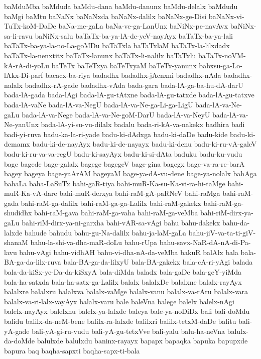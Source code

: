 {baMduMba
baMduda
baMdu-dana
baMdu-danunx
baMdu-delalx
baMdudu
baMgi
baMtu
baNaNx
baNaNxda
baNaNx-dalilx
baNaNx-ge-Disi
baNaNx-vi-TuTx-koM-DaDe
baNa-me-gaLa
baNa-ve-ga-LanUnx
baNiNx-pe-navAvx
baNiNx-sa-li-ravu
baNiNx-salu
baTaTx-ba-ya-lA-de-yeV-nayAyx
baTaTx-ba-ya-lali
baTaTx-ba-ya-la-no-La-goMDu
baTaTxla
baTaTxlaM
baTaTx-la-lilxdadx
baTaTx-la-nenxtitx
baTaTx-lanunx
baTaTx-li-nalilx
baTaTxlu
baTaTx-noVM-kA-rA-di-yoLu
baTeTx
baTeTxya
baTeTxyaM
baTeTx-yanunx
babxsu-ga-Lo-lAkx-Di-parf
bacacx-ba-riya
badadhx
badadhx-jAcnxni
badadhx-nAda
badadhx-nalalx
badadhx-rA-gade
badadhx-vAda
bada-gara
bada-lA-ga-ba-hu-dA-darU
bada-lA-gada
bada-lAgi
bada-lA-gu-tAtxne
bada-lA-gu-tatxde
bada-lA-gu-tatxve
bada-lA-vaNe
bada-lA-va-NegU
bada-lA-va-Ne-ga-Li-ga-LigU
bada-lA-va-Ne-gaLu
bada-lA-va-Nege
bada-lA-va-Ne-goM-DarU
bada-lA-va-NeyU
bada-lA-va-Ne-yanUnx
bada-lA-yi-su-vu-dilalx
badalu
bada-ri-kA-va-nakekx
badhira
badi
badi-yi-ruva
badu-ka-la-ri-yade
badu-ki-dAdxga
badu-ki-daDe
badu-kide
badu-ki-demamx
badu-ki-de-nayAyx
badu-ki-de-nayayx
badu-ki-denu
badu-ki-ru-vA-galeV
badu-ki-ru-va-va-regU
badu-ki-sayAyx
badu-ki-si-dAta
baduku
badu-ku-vudu
bage
bagede
bage-galalx
bagege
bagegeV
bage-gina
bagegx
bage-va-ra-re-barA
bagey
bageya
bage-yaArAM
bageyaM
bage-ya-dA-vu-dene
bage-ya-nolalx
bahAga
bahaLa
baha-LaSuTx
bahi-gaR-tiya
bahi-muR-Ka-su-Ka-vi-ra-hi-taMge
bahi-muR-Ka-vA-dare
bahi-muR-derxya
bahi-raM-gA-paRNeV
bahi-raMga
bahi-raM-gada
bahi-raM-ga-dalilx
bahi-raM-ga-ga-Lalilx
bahi-raM-gakekx
bahi-raM-ga-shudidhx
bahi-raM-gava
bahi-raM-ga-vaha
bahi-raM-ga-veMba
bahi-riM-dirx-ya-gaLu
bahi-riM-dirx-ya-ni-garxha
bahi-vAR-sa-vAgi
bahu
bahu-dakekx
bahu-da-lalxde
bahude
bahudu
bahu-gu-Na-dalilx
bahu-ja-laM-gaLa
bahu-jiV-va-ta-ti-giV-shanaM
bahu-la-shi-va-dha-maR-doLu
bahu-rUpa
bahu-savx-NaR-dA-nA-di-Pa-lavu
bahu-vAgi
bahu-vidhAH
bahu-vi-dha-nA-da-veMba
bakuR
balAlx
bala
bala-BA-ga-da-lilx-ruva
bala-BA-ga-da-lilxyU
bala-BA-gakekx
bala-cA-ri-yAgi
balada
bala-da-kiSx-ye-Da-da-kiSxyA
bala-diMda
baladx
bala-gaDe
bala-geY-yiMda
bala-ha-satxda
bala-ha-satx-ga-Lalilx
balalx
balalxDe
balalxne
balalx-rayAyx
balalxre
balalxru
balalxva
balalx-vaMge
balalx-vanu
balalx-va-rAru
balalx-vara
balalx-va-ri-lalx-vayAyx
balalx-varu
bale
baleVna
balege
balelx
balelx-nAgi
balelx-nayAyx
balelxnu
balelx-ya-lalxde
baleya
bale-ya-noDiDx
bali
bali-doMdu
balidu
balilx-da-neM-bene
balilx-ra-lalxde
balilxri
balilx-tetxM-daDe
balitu
bali-yA-gade
bali-yA-gi-ru-vudu
bali-yA-gu-tetxVve
bali-yalu
balu-ha-neVna
balulx-da-doMde
balulxde
balulxdu
baninx-rayayx
bapapx
bapaqka
bapuka
bapupxde
bapura
baq
baqha-sapxti
baqha-sapx-ti-bala
}
